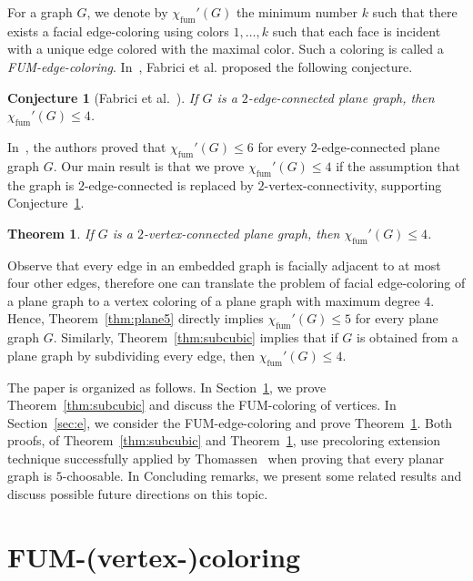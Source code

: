 \documentclass[a4paper,12pt]{article}
\newtheorem{theorem}{Theorem}
\newtheorem{conjecture}{Conjecture}
\newcommand{\chiCe}[1]{\chi_{\mathrm{fum}}'(#1)}
\begin{document}
For a graph $G$, we denote by $\chiCe{G}$ the minimum number $k$ such that
there exists a facial edge-coloring using colors $1,\ldots,k$
such that each face is incident with a unique edge colored with the maximal color.
Such a coloring is called a \emph{FUM-edge-coloring}.
In~\cite{FabJenVrb15}, Fabrici et al. proposed the following conjecture.

\begin{conjecture}[Fabrici et al.~\cite{FabJenVrb15}]
	\label{conj:main}
	If $G$ is a $2$-edge-connected plane graph, then $\chiCe{G} \leq 4$.
\end{conjecture}

In~\cite{FabJenVrb15}, the authors proved that $\chiCe{G} \leq 6$ for every $2$-edge-connected plane graph $G$.
Our main result is that we prove $\chiCe{G} \leq 4$ if the assumption that the graph is $2$-edge-connected
is replaced by $2$-vertex-connectivity, supporting Conjecture~\ref{conj:main}.

\begin{theorem}
	\label{thm:maine}
	If $G$ is a $2$-vertex-connected plane graph, then $\chiCe{G} \leq 4$.
\end{theorem}

Observe that every edge in an embedded graph is facially adjacent to at most four other edges,
therefore one can translate the problem of facial edge-coloring of a plane graph
to a vertex coloring of a plane graph with maximum degree $4$.
Hence, Theorem~\ref{thm:plane5} directly implies $\chiCe{G} \leq 5$ for every plane graph $G$.
Similarly, Theorem~\ref{thm:subcubic} implies that if $G$ is obtained from a plane graph by subdividing every edge, then $\chiCe{G} \leq 4$.

\smallskip
The paper is organized as follows.
In Section~\ref{sec:v}, we prove Theorem~\ref{thm:subcubic} and discuss the FUM-coloring of vertices.
In Section~\ref{sec:e}, we consider the FUM-edge-coloring and prove Theorem~\ref{thm:maine}.
Both proofs, of Theorem~\ref{thm:subcubic} and Theorem~\ref{thm:maine}, use precoloring extension technique
successfully applied by Thomassen~\cite{Tho94} when proving that every planar graph is $5$-choosable.
In Concluding remarks, we present some related results and discuss possible future directions on this topic.



\section{FUM-(vertex-)coloring}
\label{sec:v}
\end{document}
